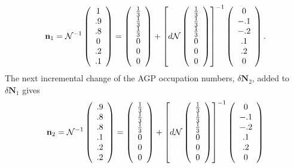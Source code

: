 \documentclass[aps,preprint]{revtex4}%
\begin{document}
\begin{equation}
\mathbf{n}_{1}=\mathcal{N}^{-1}\left(
\begin{array}
[c]{c}%
1\\
.9\\
.8\\
0\\
.2\\
.1
\end{array}
\right)  =\left(
\begin{array}
[c]{c}%
\frac{1}{3}\\
\frac{1}{3}\\
\frac{1}{3}\\
0\\
0\\
0
\end{array}
\right)  +\left[  d\mathcal{N}\left(
\begin{array}
[c]{c}%
\frac{1}{3}\\
\frac{1}{3}\\
\frac{1}{3}\\
0\\
0\\
0
\end{array}
\right)  \right]  ^{-1}\left(
\begin{array}
[c]{c}%
0\\
-.1\\
-.2\\
.1\\
.2\\
0
\end{array}
\right)  .
\end{equation}
The next incremental change of the AGP occupation numbers, $\delta
\mathbf{N}_{2}$, added to $\delta\mathbf{N}_{1}$ gives
\[
\mathbf{n}_{2}=\mathcal{N}^{-1}\left(
\begin{array}
[c]{c}%
.9\\
.8\\
.8\\
.1\\
.2\\
.2
\end{array}
\right)  =\left(
\begin{array}
[c]{c}%
\frac{1}{3}\\
\frac{1}{3}\\
\frac{1}{3}\\
0\\
0\\
0
\end{array}
\right)  +\left[  d\mathcal{N}\left(
\begin{array}
[c]{c}%
\frac{1}{3}\\
\frac{1}{3}\\
\frac{1}{3}\\
0\\
0\\
0
\end{array}
\right)  \right]  ^{-1}\left(
\begin{array}
[c]{c}%
0\\
-.1\\
-.2\\
.1\\
.2\\
0
\end{array}
\right)
\]%
\end{document}
